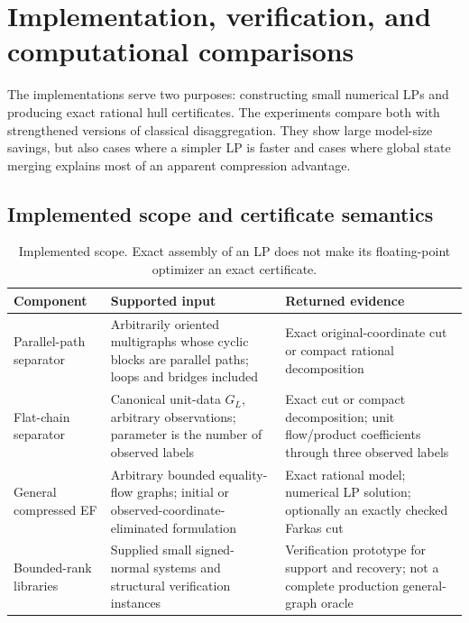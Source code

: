 \section{Implementation, verification, and computational comparisons}\label{sec:computation}


The implementations serve two purposes: constructing small numerical LPs
and producing exact rational hull certificates. The experiments compare
both with strengthened versions of classical disaggregation. They show large
model-size savings, but also cases where a simpler LP is faster and cases
where global state merging explains most of an apparent compression
advantage.

\subsection{Implemented scope and certificate semantics}

\begin{table}[tb]\centering\small
\caption{Implemented scope. Exact assembly of an LP does not make its
floating-point optimizer an exact certificate.}\label{tab:implemented-scope}
\begin{tabular}{>{\raggedright\arraybackslash}p{.19\linewidth}>{\raggedright\arraybackslash}p{.36\linewidth}>{\raggedright\arraybackslash}p{.36\linewidth}}\toprule
Component & Supported input & Returned evidence\\\midrule
Parallel-path separator & Arbitrarily oriented multigraphs whose cyclic
blocks are parallel paths; loops and bridges included & Exact original-coordinate
cut or compact rational decomposition\\[3pt]
Flat-chain separator & Canonical unit-data $G_L$, arbitrary observations;
parameter is the number of observed labels & Exact cut or compact decomposition;
unit flow/product coefficients through three observed labels\\[3pt]
General compressed EF & Arbitrary bounded equality-flow graphs; initial
or observed-coordinate-eliminated formulation & Exact rational model;
numerical LP solution; optionally an exactly checked Farkas cut\\[3pt]
Bounded-rank libraries & Supplied small signed-normal systems and structural
verification instances & Verification prototype for support and recovery;
not a complete production general-graph oracle\\\bottomrule
\end{tabular}
\end{table}

